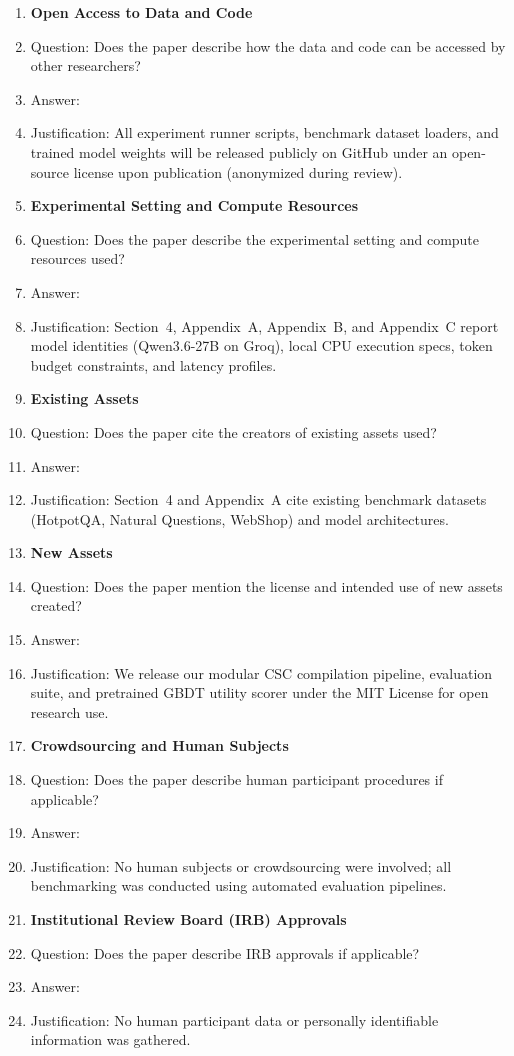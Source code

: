 \begin{enumerate}
\item {\bf Open Access to Data and Code}
    \item[] Question: Does the paper describe how the data and code can be accessed by other researchers?
    \item[] Answer: \answerYes{}
    \item[] Justification: All experiment runner scripts, benchmark dataset loaders, and trained model weights will be released publicly on GitHub under an open-source license upon publication (anonymized during review).

\item {\bf Experimental Setting and Compute Resources}
    \item[] Question: Does the paper describe the experimental setting and compute resources used?
    \item[] Answer: \answerYes{}
    \item[] Justification: Section~4, Appendix~A, Appendix~B, and Appendix~C report model identities (Qwen3.6-27B on Groq), local CPU execution specs, token budget constraints, and latency profiles.

\item {\bf Existing Assets}
    \item[] Question: Does the paper cite the creators of existing assets used?
    \item[] Answer: \answerYes{}
    \item[] Justification: Section~4 and Appendix~A cite existing benchmark datasets (HotpotQA, Natural Questions, WebShop) and model architectures.

\item {\bf New Assets}
    \item[] Question: Does the paper mention the license and intended use of new assets created?
    \item[] Answer: \answerYes{}
    \item[] Justification: We release our modular CSC compilation pipeline, evaluation suite, and pretrained GBDT utility scorer under the MIT License for open research use.

\item {\bf Crowdsourcing and Human Subjects}
    \item[] Question: Does the paper describe human participant procedures if applicable?
    \item[] Answer: \answerNA{}
    \item[] Justification: No human subjects or crowdsourcing were involved; all benchmarking was conducted using automated evaluation pipelines.

\item {\bf Institutional Review Board (IRB) Approvals}
    \item[] Question: Does the paper describe IRB approvals if applicable?
    \item[] Answer: \answerNA{}
    \item[] Justification: No human participant data or personally identifiable information was gathered.

\end{enumerate}
